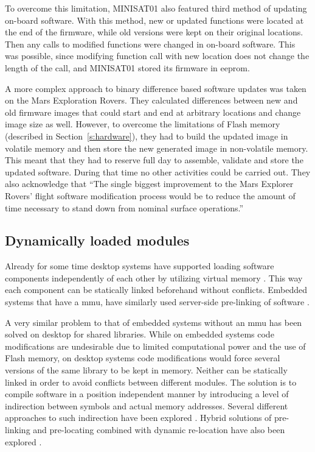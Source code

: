 To overcome this limitation, MINISAT01 also featured third method of updating on-board software. With this method, new or updated functions were located at the end of the firmware, while old versions were kept on their original locations. Then any calls to modified functions were changed in on-board software. This was possible, since modifying function call with new location does not change the length of the call, and MINISAT01 stored its firmware in \gls{eeprom}. \cite{Garrido1998}

A more complex approach to binary difference based software updates was taken on the Mars Exploration Rovers. They calculated differences between new and old firmware images that could start and end at arbitrary locations and change image size as well. However, to overcome the limitations of Flash memory (described in Section~\ref{s:hardware}), they had to build the updated image in volatile memory and then store the new generated image in non-volatile memory. This meant that they had to reserve full day to assemble, validate and store the updated software. During that time no other activities could be carried out. They also acknowledge that ``The single biggest improvement to the Mars Explorer Rovers' flight software modification process would be to reduce the amount of time necessary to stand down from nominal surface operations.'' \cite{Greco2005}

\subsection{Dynamically loaded modules}

Already for some time desktop systems have supported loading software components independently of each other by utilizing virtual memory \cite{Kilburn1962}. This way each component can be statically linked beforehand without conflicts. Embedded systems that have a \gls{mmu}, have similarly used server-side pre-linking of software \cite{Shen2010}.

A very similar problem to that of embedded systems without an \gls{mmu} has been solved on desktop for shared libraries. While on embedded systems code modifications are undesirable due to limited computational power and the use of Flash memory, on desktop systems code modifications would force several versions of the same library to be kept in memory. Neither can be statically linked in order to avoid conflicts between different modules. The solution is to compile software in a position independent manner by introducing a level of indirection between symbols and actual memory addresses. Several different approaches to such indirection have been explored \cite[Chapter~8]{Levine1999}. Hybrid solutions of pre-linking and pre-locating combined with dynamic re-location have also been explored \cite{Dong2009}.

